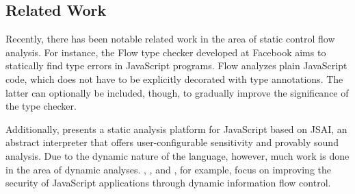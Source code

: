 \subsection{Related Work}

Recently, there has been notable related work in the area of static control flow analysis. For instance, the Flow \cite{flow} type checker developed at Facebook aims to statically find type errors in JavaScript programs. Flow analyzes plain JavaScript code, which does not have to be explicitly decorated with type annotations. The latter can optionally be included, though, to gradually improve the significance of the type checker.

Additionally, \cite{kashyap2014jsai} presents a static analysis platform for JavaScript based on JSAI, an abstract interpreter that offers user-configurable sensitivity and provably sound analysis. Due to the dynamic nature of the language, however, much work is done in the area of dynamic analyses. \cite{bichhawat2014information}, \cite{hedin2012information}, and \cite{santos2014information}, for example, focus on improving the security of JavaScript applications through dynamic information flow control.
